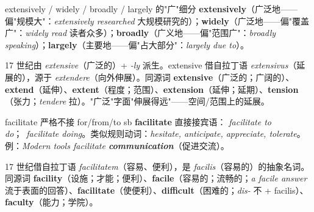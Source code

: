 \documentclass[../main.tex]{subfiles}
\begin{document}


\begin{gram}{extensively / widely / broadly / largely 的"广"细分}
\textbf{extensively}（广泛地——偏"规模大"：\textit{extensively researched} 大规模研究的）；\textbf{widely}（广泛地——偏"覆盖广"：\textit{widely read} 读者众多）；\textbf{broadly}（广义地——偏"范围广"：\textit{broadly speaking}）；\textbf{largely}（主要地——偏"占大部分"：\textit{largely due to}）。
\end{gram}

\begin{origin}
17 世纪由 \textit{extensive}（广泛的）+ \textit{-ly} 派生。extensive 借自拉丁语 \textit{extensivus}（延展的），源于 \textit{extendere}（向外伸展）。同源词 \textbf{extensive}（广泛的；广阔的）、\textbf{extend}（延伸）、\textbf{extent}（程度；范围）、\textbf{extension}（延伸；延期）、\textbf{tension}（张力；\textit{tendere} 拉）。"广泛"字面"伸展得远"——空间/范围上的延展。
\end{origin}



\begin{gram}{facilitate 严格不接 for/from/to sb}
\textbf{facilitate} 直接接宾语： \textit{facilitate to do}；\checkmark\ \textit{facilitate doing}。类似规则动词：\textit{hesitate, anticipate, appreciate, tolerate}。例：\textit{Modern tools facilitate \textbf{communication}}（促进交流）。
\end{gram}

\begin{origin}
17 世纪借自拉丁语 \textit{facilitatem}（容易、便利），是 \textit{facilis}（容易的）的抽象名词。同源词 \textbf{facility}（设施；才能；便利）、\textbf{facile}（容易的；流畅的；\textit{a facile answer} 流于表面的回答）、\textbf{facilitate}（使便利）、\textbf{difficult}（困难的；\textit{dis-} 不 + facilis）、\textbf{faculty}（能力；学院）。
\end{origin}
\end{document}
